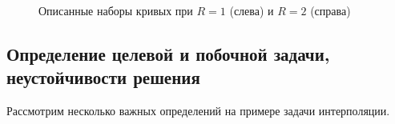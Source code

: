 \documentclass[a4paper]{article}
\begin{document}
        \begin{figure}[h]
          \begin{minipage}[h]{0.49\linewidth}
          \end{minipage}
          \hfill
          \begin{minipage}[h]{0.49\linewidth}
          \end{minipage}
          \caption{Описанные наборы кривых при $R=1$ (слева) и $R=2$ (справа)}
          \label{rr1}
        \end{figure}

\FloatBarrier
\subsection{Определение целевой и побочной задачи, неустойчивости решения}
Рассмотрим несколько важных определений на примере задачи интерполяции.
\end{document}
